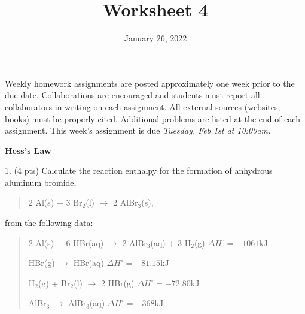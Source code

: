 \documentclass[11pt]{article}
\title{\textbf{Worksheet 4}}
\date{\vspace{-2em}January 26, 2022}
\begin{document}
\maketitle

Weekly homework assignments are posted approximately one week prior to the
due date. Collaborations are encouraged and students must report all collaborators
in writing on each assignment. All external sources (websites, books) must be
properly cited. Additional problems are listed at the end of each assignment.
This week's assignment is due \textit{Tuesday, Feb 1st at 10:00am.}

\textbf{Hess's Law}

1. (4 pts) Calculate the reaction enthalpy for the formation of anhydrous aluminum
bromide,
\begin{quote}
2 Al(s) + 3 Br$_2$(l) $\rightarrow$ 2 AlBr$_3$(s),
\end{quote}
from the following data:
\begin{quote}
2 Al(s) + 6 HBr(aq) $\rightarrow$ 2 AlBr$_3$(aq) + 3 H$_2$(g)  $\Delta H^\circ = - 1061\text{kJ}$

HBr(g) $\rightarrow$ HBr(aq) $\Delta H^\circ = -81.15\text{kJ}$

H$_2$(g) + Br$_2$(l) $\rightarrow$ 2 HBr(g) $\Delta H^\circ = -72.80\text{kJ}$

AlBr$_3$ $\rightarrow$ AlBr$_3$(aq) $\Delta H^\circ = -368\text{kJ}$
\end{quote}

\pagebreak
\end{document}
